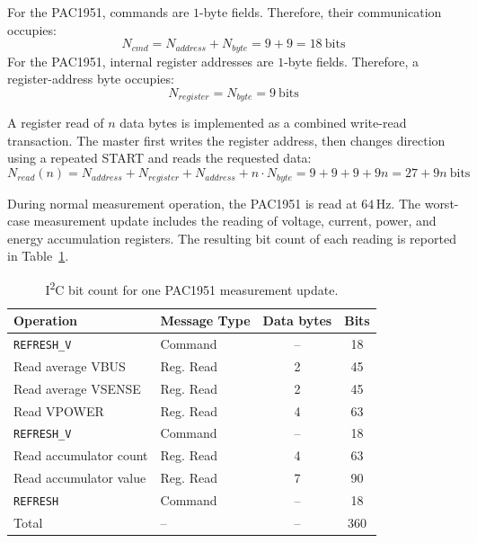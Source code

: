 For the PAC1951, commands are \(1\)-byte fields. 
Therefore, their communication occupies:
\begin{equation}
	N_{cmd}	= N_{address} + N_{byte} 
	= 9 + 9 = 18 \ \mathrm{bits}
\end{equation}
For the PAC1951, internal register addresses are \(1\)-byte fields. 
Therefore, a register-address byte occupies:
\begin{equation}
	N_{register}	= N_{byte}  = 9  \ \mathrm{bits}
\end{equation}

A register read of \(n\) data bytes is implemented as a combined write-read transaction. 
The master first writes the register address, then changes direction using a repeated START and reads the requested data:
\begin{equation}
	N_{read}(n)	= N_{address} + N_{register} + N_{address} + n \cdot N_{byte}
	= 9 + 9 + 9 + 9n 
	= 27 + 9n \ \mathrm{bits}
\end{equation}

During normal measurement operation, the PAC1951 is read at \(64\,\mathrm{Hz}\). 
The worst-case measurement update includes the reading of voltage, current, power, and energy accumulation registers.
The resulting bit count of each reading is reported in Table~\ref{tab:i2c_pac_bit_count}.
\begin{table}[H]
	\centering
	\small
	\caption{I\textsuperscript{2}C bit count for one PAC1951 measurement update.}
	\label{tab:i2c_pac_bit_count}
	\begin{tabularx}{0.78\textwidth}{@{}X l c c@{}}
		\toprule
		\textbf{Operation} & \textbf{Message Type} & \textbf{Data bytes} & \textbf{Bits} \\
		\midrule
		\texttt{REFRESH\_V} 	& Command	& --	& 18 \\
		Read average VBUS 		& Reg. Read	& 2		& 45 \\
		Read average VSENSE 	& Reg. Read	& 2		& 45 \\
		Read VPOWER 			& Reg. Read	& 4		& 63 \\
		\texttt{REFRESH\_V}		& Command	& --	& 18 \\
		Read accumulator count 	& Reg. Read	& 4		& 63 \\
		Read accumulator value 	& Reg. Read	& 7		& 90 \\
		\texttt{REFRESH} 		& Command	& --	& 18 \\
		\midrule
		Total 					& --		& -- 	& 360 \\
		\bottomrule
	\end{tabularx}
\end{table}

